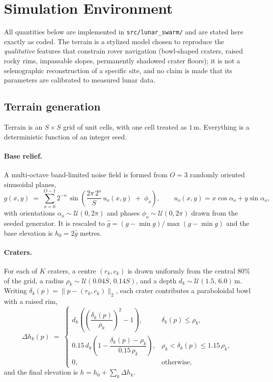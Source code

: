 \documentclass[11pt]{article}
\begin{document}
\section{Simulation Environment}
\label{sec:sim}

All quantities below are implemented in \texttt{src/lunar\_swarm/} and are
stated here exactly as coded. The terrain is a stylized model chosen to
reproduce the \emph{qualitative} features that constrain rover navigation
(bowl-shaped craters, raised rocky rims, impassable slopes, permanently
shadowed crater floors); it is not a selenographic reconstruction of a specific
site, and no claim is made that its parameters are calibrated to measured lunar
data.

\subsection{Terrain generation}

Terrain is an $S \times S$ grid of unit cells, with one cell treated as
$1\,\mathrm{m}$. Everything is a deterministic function of an integer seed.

\paragraph{Base relief.}
A multi-octave band-limited noise field is formed from $O = 3$ randomly
oriented sinusoidal planes,
\begin{equation}
g(x,y) \;=\; \sum_{o=0}^{O-1} 2^{-o}\,
  \sin\!\left( \frac{2\pi\,2^{o}}{S}\,u_o(x,y) \;+\; \phi_o \right),
  \qquad
  u_o(x,y) = x\cos\alpha_o + y\sin\alpha_o ,
\end{equation}
with orientations $\alpha_o \sim \mathcal{U}(0,2\pi)$ and phases
$\phi_o \sim \mathcal{U}(0,2\pi)$ drawn from the seeded generator. It is
rescaled to $\hat g = (g - \min g)/\max(g - \min g)$ and the base elevation is
$h_0 = 2\hat g$ metres.

\paragraph{Craters.}
For each of $K$ craters, a centre $(r_k,c_k)$ is drawn uniformly from the
central $80\%$ of the grid, a radius $\rho_k \sim \mathcal{U}(0.04S,\,0.14S)$,
and a depth $d_k \sim \mathcal{U}(1.5,\,6.0)\,\mathrm{m}$. Writing
$\delta_k(p) = \lVert p - (r_k,c_k) \rVert_2$, each crater contributes a
paraboloidal bowl with a raised rim,
\begin{equation}
\Delta h_k(p) \;=\;
\begin{cases}
d_k\left( \left(\dfrac{\delta_k(p)}{\rho_k}\right)^{2} - 1 \right),
  & \delta_k(p) \le \rho_k, \\[2.2ex]
0.15\,d_k\left( 1 - \dfrac{\delta_k(p)-\rho_k}{0.15\,\rho_k} \right),
  & \rho_k < \delta_k(p) \le 1.15\,\rho_k, \\[2.2ex]
0, & \text{otherwise,}
\end{cases}
\end{equation}
and the final elevation is $h = h_0 + \sum_k \Delta h_k$.
\end{document}
